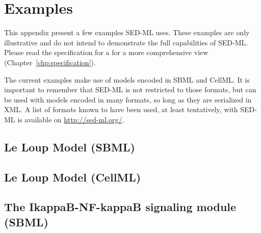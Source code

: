 \chapter{Examples}

This appendix present a few examples SED-ML uses. These examples are only illustrative and do not intend to demonstrate the full capabilities of SED-ML. Please read the specification for  a for a more comprehensive view (Chapter~\ref{chp:specification}). 

The current examples make use of models encoded in SBML and CellML. It is important to remember that SED-ML is not restricted to those formats, but can be used with models encoded in many formats, so long as they are serialized in XML. A list of formats known to have been used, at least tentatively, with SED-ML is available on \url{http://sed-ml.org/}.

\section{Le Loup Model (SBML)}


\section{Le Loup Model (CellML)}


\newpage
\section{The IkappaB-NF-kappaB signaling module (SBML)}
